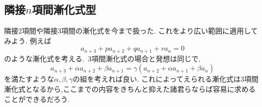 \subsection{隣接$n$項間漸化式型}
隣接2項間や隣接3項間の漸化式を今まで扱った.
これをより広い範囲に適用してみよう.
例えば
\[
  a_{n+3}+pa_{n+2}+qa_{n+1}+ra_n=0
\]
のような漸化式を考える.
\,3項間漸化式の場合と発想は同じで,
\[
  a_{n+3}+\alpha a_{n+2}+\beta a_{n+1}=\gamma \left(a_{n+2}+\alpha a_{n+1}+\beta a_{n}\right)
\]
を満たすような$\alpha,\beta,\gamma$の組を考えれば良い.
これによってえられる漸化式は3項間漸化式となるから,ここまでの内容をきちんと抑えた諸君らならば容易に求めることができるだろう.